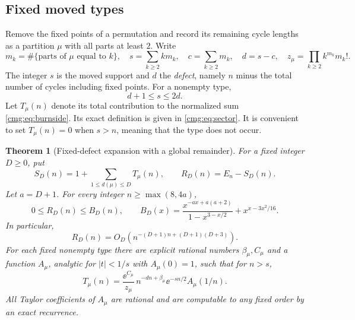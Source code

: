 \documentclass[11pt,letterpaper]{article}
\numberwithin{equation}{section}
\newtheorem{theorem}{Theorem}[section]
\theoremstyle{definition}\newtheorem{definition}[theorem]{Definition}
\theoremstyle{remark}\newtheorem{remark}[theorem]{Remark}
\begin{document}
\subsection{Fixed moved types}
Remove the fixed points of a permutation and record its remaining cycle lengths as a partition $\mu$ with all parts at least $2$. Write
\begin{equation}\label{cmg:eq:parameters}
 m_k=\#\{\text{parts of $\mu$ equal to $k$}\},\quad
 s=\sum_{k\ge2}km_k,\quad c=\sum_{k\ge2}m_k,\quad d=s-c,\quad
 z_\mu=\prod_{k\ge2}k^{m_k}m_k!.
\end{equation}
The integer $s$ is the moved support and $d$ the \emph{defect}, namely $n$ minus the total number of cycles including fixed points. For a nonempty type,
\begin{equation}\label{cmg:eq:support-range}
 d+1\le s\le2d.
\end{equation}
Let $T_\mu(n)$ denote its total contribution to the normalized sum \eqref{cmg:eq:burnside}. Its exact definition is given in \eqref{cmg:eq:sector}. It is convenient to set $T_\mu(n)=0$ when $s>n$, meaning that the type does not occur.

\begin{theorem}[Fixed-defect expansion with a global remainder]\label{cmg:thm:overview}
For a fixed integer $D\ge0$, put
\begin{equation}\label{cmg:eq:SD}
 S_D(n)=1+\sum_{1\le d(\mu)\le D}T_\mu(n),\qquad R_D(n)=E_n-S_D(n).
\end{equation}
Let $a=D+1$. For every integer $n\ge\max(8,4a)$,
\begin{equation}\label{cmg:eq:BD-main}
 0\le R_D(n)\le B_D(n),\qquad
 B_D(x)=\frac{x^{-ax+a(a+2)}}{1-x^{3-x/2}}+x^{x-3x^2/16}.
\end{equation}
In particular,
\begin{equation}\label{cmg:eq:Rorder}
 R_D(n)=O_D\!\left(n^{-(D+1)n+(D+1)(D+3)}\right).
\end{equation}
For each fixed nonempty type there are explicit rational numbers $\beta_\mu,C_\mu$ and a function $A_\mu$, analytic for $|t|<1/s$ with $A_\mu(0)=1$, such that for $n>s$,
\begin{equation}\label{cmg:eq:amplitude-main}
 T_\mu(n)=\frac{\ee^{C_\mu}}{z_\mu}\,
 n^{-dn+\beta_\mu}\ee^{-sn/2}A_\mu(1/n).
\end{equation}
All Taylor coefficients of $A_\mu$ are rational and are computable to any fixed order by an exact recurrence.
\end{theorem}
\end{document}
